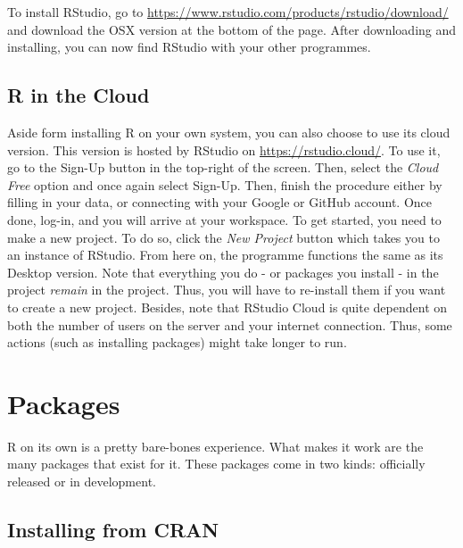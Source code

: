 \documentclass[
]{book}
\begin{document}
To install RStudio, go to \url{https://www.rstudio.com/products/rstudio/download/} and download the OSX version at the bottom of the page. After downloading and installing, you can now find RStudio with your other programmes.

\hypertarget{r-in-the-cloud}{%
\subsection{R in the Cloud}\label{r-in-the-cloud}}

Aside form installing R on your own system, you can also choose to use its cloud version. This version is hosted by RStudio on \url{https://rstudio.cloud/}. To use it, go to the Sign-Up button in the top-right of the screen. Then, select the \emph{Cloud Free} option and once again select Sign-Up. Then, finish the procedure either by filling in your data, or connecting with your Google or GitHub account. Once done, log-in, and you will arrive at your workspace. To get started, you need to make a new project. To do so, click the \emph{New Project} button which takes you to an instance of RStudio. From here on, the programme functions the same as its Desktop version. Note that everything you do - or packages you install - in the project \emph{remain} in the project. Thus, you will have to re-install them if you want to create a new project. Besides, note that RStudio Cloud is quite dependent on both the number of users on the server and your internet connection. Thus, some actions (such as installing packages) might take longer to run.

\hypertarget{packages}{%
\section{Packages}\label{packages}}

R on its own is a pretty bare-bones experience. What makes it work are the many packages that exist for it. These packages come in two kinds: officially released or in development.

\hypertarget{installing-from-cran}{%
\subsection{Installing from CRAN}\label{installing-from-cran}}
\end{document}
